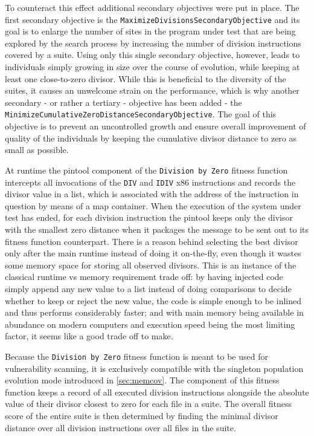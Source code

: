 To counteract this effect additional secondary objectives were put in place. The first secondary objective is
the \texttt{MaximizeDivisionsSecondaryObjective} and its goal is to enlarge the number of sites in the
program under test that are being explored by the search process by increasing the number of division
instructions covered by a suite. Using only this single secondary objective, however, leads to individuals
simply growing in size over the course of evolution, while keeping at least one close-to-zero divisor. While
this is beneficial to the diversity of the suites, it causes an unwelcome strain on the performance, which
is why another secondary - or rather a tertiary - objective has been added - the
\texttt{MinimizeCumulativeZeroDistanceSecondaryObjective}. The goal of this objective is to prevent an
uncontrolled growth and ensure overall improvement of quality of the individuals by keeping the cumulative
divisor distance to zero as small as possible.

At runtime the pintool component of the \texttt{Division by Zero} fitness function intercepts all invocations
of the \texttt{DIV} and \texttt{IDIV} x86 instructions and records the divisor value in a list, which is
associated with the address of the instruction in question by means of a map container. When the execution of
the system under test has ended, for each division instruction the pintool keeps only the divisor with the
smallest zero distance when it packages the message to be sent out to its \java fitness function counterpart.
There is a reason behind selecting the best divisor only after the main runtime instead of doing it on-the-fly,
even though it wastes some memory space for storing all observed divisors. This is an instance of the classical
runtime vs memory requirement trade off: by having injected code simply append any new value to a list
instead of doing comparisons to decide whether to keep or reject the new value, the code is simple enough to
be inlined and thus performs considerably faster; and with main memory being available in abundance on  modern
computers and execution speed being the most limiting factor, it seems like a good trade off to make.

Because the \texttt{Division by Zero} fitness function is meant to be used for vulnerability scanning, it is
exclusively compatible with the singleton population evolution mode introduced in \cref{sec:memcov}. The \java
component of this fitness function keeps a record of all executed division instructions alongside the absolute
value of their divisor closest to zero for each file in a suite. The overall fitness score of the entire suite
is then determined by finding the minimal divisor distance over all division instructions over all files in
the suite.

